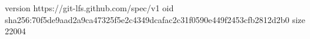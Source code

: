 version https://git-lfs.github.com/spec/v1
oid sha256:70f5de9aad2a9ca47325f5e2c4349dcafac2c31f0590e449f2453cfb2812d2b0
size 22004
